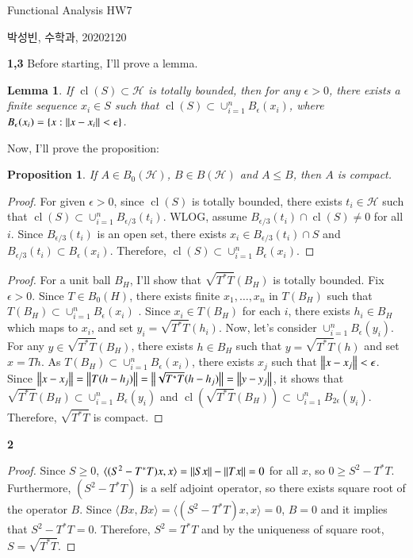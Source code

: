 \documentclass[a4paper, 12pt]{article}
\theoremstyle{Mydefinition}
\theoremstyle{Mytheorem}
\newtheorem{proposition}[statement]{Proposition}
\newtheorem{lemma}[statement]{Lemma}
\DeclareMathOperator{\cl}{cl}
\begin{document}
\thispagestyle{myfirstpage}
\begin{center}
	\Large{Functional Analysis HW7}
\end{center}
박성빈, 수학과, 20202120

\noindent \textbf{1,3}
Before starting, I'll prove a lemma.
\begin{lemma}
If $\cl(S)\subset \mathscr{H}$ is totally bounded, then for any $\epsilon>0$, there exists a finite sequence $x_i\in S$ such that $\cl(S)\subset \cup_{i=1}^n B_\epsilon(x_i)$, where $B_\epsilon(x_i) = \{x:\norm{x-x_i}<\epsilon\}$.
\end{lemma}
Now, I'll prove the proposition:
\begin{proposition}
If $A\in B_0(\mathscr{H})$, $B\in B(\mathscr{H})$ and $A\leq B$, then $A$ is compact.
\end{proposition}
\begin{proof}
For given $\epsilon>0$, since $\cl(S)$ is totally bounded, there exists $t_i\in \mathscr{H}$ such that $\cl(S)\subset \cup_{i=1}^n B_{\epsilon/3}(t_i)$. WLOG, assume $B_{\epsilon/3}(t_i)\cap \cl(S)\neq 0$ for all $i$. Since $B_{\epsilon/3}(t_i)$ is an open set, there exists $x_i\in B_{\epsilon/3}(t_i)\cap S$ and $B_{\epsilon/3}(t_i)\subset B_\epsilon(x_i)$. Therefore, $\cl(S)\subset \cup_{i=1}^n B_\epsilon(x_i)$.
\end{proof}

\begin{proof}
For a unit ball $B_H$, I'll show that $\sqrt{T^*T}(B_H)$ is totally bounded. Fix $\epsilon>0$. Since $T\in B_0(H)$, there exists finite $x_1, \ldots, x_n$ in $T(B_H)$ such that $T(B_H)\subset \cup_{i=1}^n B_\epsilon(x_i)$ . Since $x_i\in T(B_H)$ for each $i$, there exists $h_i\in B_H$ which maps to $x_i$, and set $y_i = \sqrt{T^*T}(h_i)$. Now, let's consider $\cup_{i=1}^n B_\epsilon(y_i)$. For any $y\in \sqrt{T^*T}(B_H)$, there exists $h\in B_H$ such that $y = \sqrt{T^*T}(h)$ and set $x = Th$. As $T(B_H)\subset \cup_{i=1}^n B_\epsilon(x_i)$, there exists $x_j$ such that $\norm{x-x_j}<\epsilon$. Since $\norm{x-x_j} = \norm{T(h-h_j)} = \norm{\sqrt{T^*T}(h-h_j)} = \norm{y-y_j}$, it shows that $\sqrt{T^*T}(B_H)\subset \cup_{i=1}^n B_\epsilon(y_i)$ and $\cl(\sqrt{T^*T}(B_H))\subset \cup_{i=1}^n B_{2\epsilon}(y_i)$. Therefore, $\sqrt{T^*T}$ is compact.
\end{proof}

\noindent \textbf{2}
\begin{proof}
Since $S\geq 0$, $\langle (S^2-T^*T)x, x\rangle = \norm{Sx}-\norm{Tx} = 0$ for all $x$, so $0\geq S^2-T^*T$. Furthermore, $(S^2-T^*T)$ is a self adjoint operator, so there exists square root of the operator $B$. Since $\langle Bx, Bx\rangle = \langle (S^2-T^*T)x, x\rangle = 0$, $B = 0$ and it implies that $S^2-T^*T = 0$. Therefore, $S^2 = T^*T$ and by the uniqueness of square root, $S=\sqrt{T^*T}$.
\end{proof}
\end{document}
